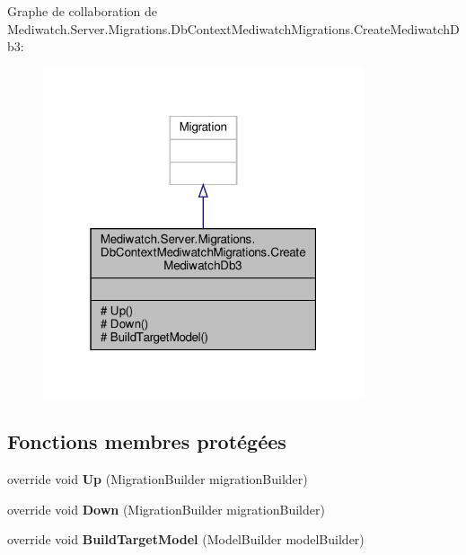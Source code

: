 Graphe de collaboration de Mediwatch.\+Server.\+Migrations.\+Db\+Context\+Mediwatch\+Migrations.\+Create\+Mediwatch\+Db3\+:
\nopagebreak
\begin{figure}[H]
\begin{center}
\leavevmode
\includegraphics[width=268pt]{class_mediwatch_1_1_server_1_1_migrations_1_1_db_context_mediwatch_migrations_1_1_create_mediwatch_db3__coll__graph}
\end{center}
\end{figure}
\subsection*{Fonctions membres protégées}
\begin{DoxyCompactItemize}
\item 
\mbox{\label{class_mediwatch_1_1_server_1_1_migrations_1_1_db_context_mediwatch_migrations_1_1_create_mediwatch_db3_a8c9495dcc2accbe3f6b37e1acdd19122}} 
override void {\bfseries Up} (Migration\+Builder migration\+Builder)
\item 
\mbox{\label{class_mediwatch_1_1_server_1_1_migrations_1_1_db_context_mediwatch_migrations_1_1_create_mediwatch_db3_a4a72c103f72d65836ed881119a60f6d8}} 
override void {\bfseries Down} (Migration\+Builder migration\+Builder)
\item 
\mbox{\label{class_mediwatch_1_1_server_1_1_migrations_1_1_db_context_mediwatch_migrations_1_1_create_mediwatch_db3_aeaaed884da705fca8e2f82fee7a32192}} 
override void {\bfseries Build\+Target\+Model} (Model\+Builder model\+Builder)
\end{DoxyCompactItemize}


